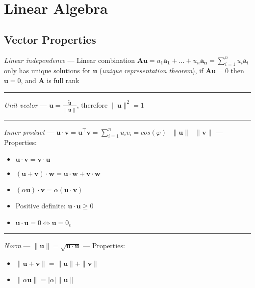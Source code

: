 \section{Linear Algebra}
\subsection*{Vector Properties}
\emph{Linear independence} --- Linear combination $\boldsymbol{A}\boldsymbol{u} = u_1 \boldsymbol{a_1} + ... + u_n \boldsymbol{a_n} = \sum_{i=1}^n u_i \boldsymbol{a_i}$ only has unique solutions for $\boldsymbol{u}$ (\emph{unique representation theorem}), if $\boldsymbol{A}\boldsymbol{u}=0$ then  $\boldsymbol{u}=0$, and $\boldsymbol{A}$ is full rank

{\color{lightgray}\hrule height 0.001mm}

\emph{Unit vector} --- $\boldsymbol{u} = \frac{\boldsymbol{\tilde{u}}}{\|\boldsymbol{\tilde{u}}\|}$, therefore $\|\boldsymbol{u}\|^2 = 1$

{\color{lightgray}\hrule height 0.001mm}

\emph{Inner product} --- $\boldsymbol{u} \cdot \boldsymbol{v} = \boldsymbol{u}^\intercal\boldsymbol{v} = \sum_{i=1}^n u_i v_i = cos(\varphi) \textrm{ } \|\boldsymbol{u}\| \textrm{ } 
 \|\boldsymbol{v}\|$ --- 
Properties:
\begin{multicols}{2}
\begin{itemize}
    \item $\boldsymbol{u} \cdot \boldsymbol{v} = \boldsymbol{v} \cdot \boldsymbol{u}$
    \item $(\boldsymbol{u}+\boldsymbol{v}) \cdot \boldsymbol{w} = \boldsymbol{u} \cdot \boldsymbol{w} + \boldsymbol{v} \cdot \boldsymbol{w}$
    \item $(\alpha\boldsymbol{u}) \cdot \boldsymbol{v} = \alpha (\boldsymbol{u} \cdot \boldsymbol{v})$
    \item Positive definite: $\boldsymbol{u} \cdot \boldsymbol{u} \geq 0$
    \item $\boldsymbol{u} \cdot \boldsymbol{u} = 0 \Leftrightarrow \boldsymbol{u} = 0_v$
\end{itemize}
\end{multicols}

{\color{lightgray}\hrule height 0.001mm}

\emph{Norm} --- 
$\|\boldsymbol{u}\| = \sqrt{\boldsymbol{u} \cdot \boldsymbol{u}}$ --- 
Properties:
\begin{multicols}{2}
\begin{itemize}
    \item $\|\boldsymbol{u}+\boldsymbol{v}\| = \|\boldsymbol{u}\| + \| \boldsymbol{v}\|$
    \item $\|\alpha\boldsymbol{u}\| = |\alpha| \|\boldsymbol{u}\|$
\end{itemize}
\end{multicols}

